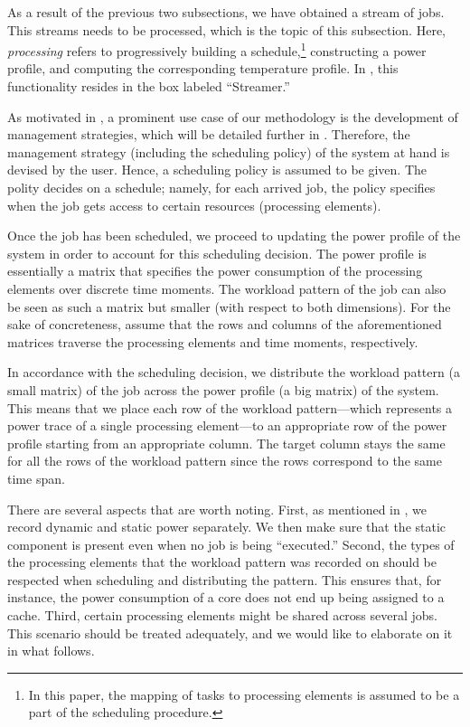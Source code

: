 As a result of the previous two subsections, we have obtained a stream of jobs.
This streams needs to be processed, which is the topic of this subsection. Here,
\emph{processing} refers to progressively building a schedule,\footnote{In this
paper, the mapping of tasks to processing elements is assumed to be a part of
the scheduling procedure.} constructing a power profile, and computing the
corresponding temperature profile. In , this functionality
resides in the box labeled ``Streamer.''

As motivated in , a prominent use case of our methodology is
the development of management strategies, which will be detailed further in
. Therefore, the management strategy (including the
scheduling policy) of the system at hand is devised by the user. Hence, a
scheduling policy is assumed to be given. The polity decides on a schedule;
namely, for each arrived job, the policy specifies when the job gets access to
certain resources (processing elements).

Once the job has been scheduled, we proceed to updating the power profile of the
system in order to account for this scheduling decision. The power profile is
essentially a matrix that specifies the power consumption of the processing
elements over discrete time moments. The workload pattern of the job can also be
seen as such a matrix but smaller (with respect to both dimensions). For the
sake of concreteness, assume that the rows and columns of the aforementioned
matrices traverse the processing elements and time moments, respectively.

In accordance with the scheduling decision, we distribute the workload pattern
(a small matrix) of the job across the power profile (a big matrix) of the
system. This means that we place each row of the workload pattern---which
represents a power trace of a single processing element---to an appropriate row
of the power profile starting from an appropriate column. The target column
stays the same for all the rows of the workload pattern since the rows
correspond to the same time span.

There are several aspects that are worth noting. First, as mentioned in
, we record dynamic and static power separately. We then make
sure that the static component is present even when no job is being
``executed.'' Second, the types of the processing elements that the workload
pattern was recorded on should be respected when scheduling and distributing the
pattern. This ensures that, for instance, the power consumption of a core does
not end up being assigned to a cache. Third, certain processing elements might
be shared across several jobs. This scenario should be treated adequately, and
we would like to elaborate on it in what follows.

